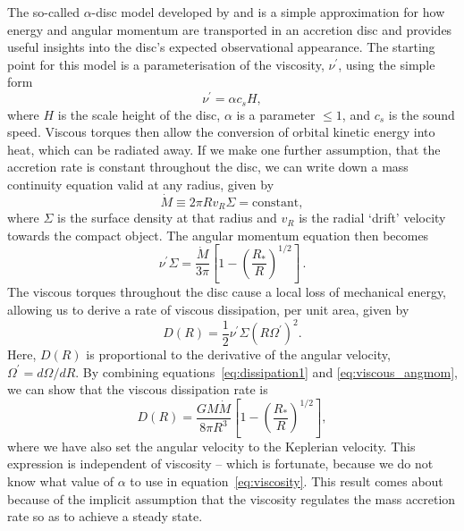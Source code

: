 The so-called $\alpha$-disc model developed by 
\citet[][hereafter SS73]{shakurasunyaev1973} and \cite{lyndenbell1969} is
a simple approximation for how energy and angular momentum
are transported in an accretion disc and provides useful insights into
the disc's expected observational appearance. 
The starting point for this model is a parameterisation
of the viscosity, $\nu^\prime$, using the simple form
\begin{equation}
\nu^\prime = \alpha c_s H,
\label{eq:viscosity}
\end{equation}
where $H$ is the scale height of the disc,
$\alpha$ is a parameter $\leq 1$, and $c_s$ is the sound speed.
Viscous torques then allow the conversion of orbital kinetic energy into heat, 
which can be radiated away. 
If we make one further assumption, that the accretion rate is
constant throughout the disc, we can write down a mass continuity equation
valid at any radius, given by
\begin{equation}
\dot{M} \equiv 2 \pi R v_R \Sigma = \mathrm{constant},
\end{equation}
where $\Sigma$ is the surface density at that radius and $v_R$ is the radial `drift' velocity
towards the compact object. The angular momentum equation then becomes
\begin{equation}
\nu^\prime \Sigma = \frac{\dot{M}}{3 \pi} \left[1 - \left( \frac{R_*}{R} \right)^{1/2} \right]\, .
\label{eq:viscous_angmom}
\end{equation}
The viscous torques throughout the disc cause a local loss of mechanical energy, allowing 
us to derive \citep[see, e.g.][]{fkrbook} a rate of viscous dissipation, 
per unit area, given by
\begin{equation}
D(R) = \frac{1}{2} \nu^\prime \Sigma (R \Omega^\prime)^2.
\label{eq:dissipation1}
\end{equation}
Here, $D(R)$ is proportional to the derivative of the angular velocity, $\Omega^\prime=d\Omega/dR$.
By combining equations~\ref{eq:dissipation1} and \ref{eq:viscous_angmom}, we can show that the 
viscous dissipation rate is 
\begin{equation}
D(R) = \frac{G M \dot{M}}{8 \pi R^3} \left[1 - \left( \frac{R_*}{R} \right)^{1/2} \right],
\label{eq:dissipation2}
\end{equation}
where we have also set the angular velocity to the Keplerian velocity. 
This expression is independent of viscosity -- which is fortunate, because
we do not know what value of $\alpha$ to use in equation~\ref{eq:viscosity}.
This result comes about because of the implicit assumption that the viscosity regulates
the mass accretion rate so as to achieve a steady state.

